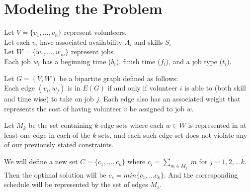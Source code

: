 \documentclass[12pt]{article}
\theoremstyle{definition}
\begin{document}

\section{Modeling the Problem}
Let $V = \{v_1, \ldots , v_n\}$ represent volunteers.\\
Let each $v_i$ have associated availability $A_i$ and skills $S_i$\\
Let $W = \{w_1, \ldots , w_m\}$ represent jobs. \\
Each job $w_i$ has a beginning time ($b_i$), finish time ($f_i$), and a job type ($t_i$).
\vspace{4mm}

\noindent Let $G = (V, W)$ be a bipartite graph defined as follows:\\
Each edge $(v_i, w_j)$ is in $E(G)$ if and only if volunteer $i$ is able to (both skill and time wise)
to take on job $j$. Each edge also has an associated weight that represents the cost of having
volunteer $v$ be assigned to job $w$.
\vspace{4mm}

\noindent Let $M_k$ be the set containing $k$ edge sets where each $w \in W$ is represented in at
least one edge in each of the $k$ sets, and each such edge set does not violate any of our previously 
stated constraints.
\vspace{4mm}

\noindent We will define a new set $C = \{c_1, \ldots , c_k\}$ where $c_i = \sum_{m \in M_j}\;m$ 
for $j = 1, 2, ... k$. Then the optimal solution will be $c_s = min\{c_1, \ldots c_k\}$. And the corresponding schedule will be represented by the set of edges $M_s$.
\end{document}
